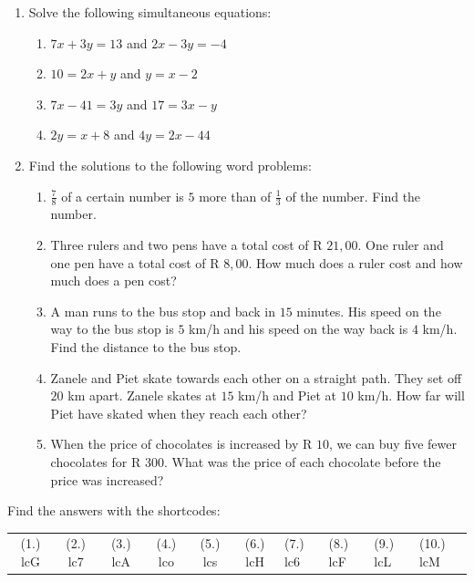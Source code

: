 \begin{eocexercises}{}
\begin{enumerate}[itemsep=5pt, label=\textbf{\arabic*}. ]
\item Solve the following simultaneous equations:
\begin{enumerate}[itemsep=5pt,label=\textbf{(\alph*)}]
\item $7x+3y=13$ and $2x-3y=-4$  
\item $10=2x+y$ and $y=x-2$
\item $7x-41=3y$ and $17=3x-y$
\item $2y=x+8$ and $4y=2x-44$
\end{enumerate}

\item Find the solutions to the following word problems:
\begin{enumerate}[itemsep=5pt,label=\textbf{(\alph*)}]
\item $\frac{7}{8}$ of a certain number is $5$ more than of $\frac{1}{3}$ of the number. Find the number.
\item Three rulers and two pens have a total cost of R $21,00$. One ruler and one pen have a total cost of R $8,00$. How much does a ruler cost and how much does a pen cost? 
\item A man runs to the bus stop and back in $15$ minutes. His speed on the way to the bus stop is $5$ km/h and his speed on the way back is $4$ km/h. Find the distance to the bus stop.
\item Zanele and Piet skate towards each other on a straight path. They set off $20$ km apart. Zanele skates at $15$ km/h and Piet at $10$ km/h. How far will Piet have skated when they reach each other?
\item When the price of chocolates is increased by R $10$, we can buy five fewer chocolates for R $300$. What was the price of each chocolate before the price was increased?
   

\end{enumerate}
\end{enumerate}
\practiceinfo
\par {} Find the answers with the shortcodes:
\par \begin{tabular}[h]{cccccc}
(1.) lcG  &  (2.) lc7  &  (3.) lcA  &  (4.) lco  &  (5.) lcs  &  (6.) lcH  &  (7.) lc6  &  (8.) lcF  &  (9.) lcL  &  (10.) lcM  & \end{tabular}

\end{eocexercises}
